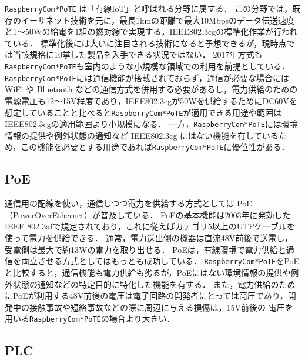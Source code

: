 {\tt Raspberry\-Com*PoTE} は「有線IoT」と呼ばれる分野に属する．
この分野では，既存のイーサネット技術を元に，最長1kmの距離で最大10Mbpsのデータ伝送速度と1〜50Wの給電を1組の撚対線で実現する，IEEE802.3cgの標準化作業が行われている．
標準化後には大いに注目される技術になると予想できるが，現時点では当該規格に10挙した製品を入手できる状況ではない．
2017年方式も{\tt Raspberry\-Com*PoTE}も室内のような小規模な領域での利用を前提としている．
{\tt Raspberry\-Com*PoTE}には通信機能が搭載されておらず，通信が必要な場合には WiFi や Bluetooth などの通信方式を併用する必要があるし，電力供給のための電源電圧も12〜15V程度であり，IEEE802.3cgが50Wを供給するためにDC60Vを想定していることと比べると{\tt Raspberry\-Com*PoTE}が適用できる用途や範囲はIEEE802.3cgの適用範囲より小規模になる．
一方，{\tt Raspberry\-Com*PoTE}には環境情報の提供や例外状態の通知など IEEE802.3cg にはない機能を有しているため，この機能を必要とする用途であれば{\tt Raspberry\-Com*PoTE}に優位性がある．




\subsection{PoE}

通信用の配線を使い，通信しつつ電力を供給する方式としては PoE（PowerOverEthernet）が普及している．
PoEの基本機能は2003年に発効したIEEE 802.3afで規定されており，これに従えばカテゴリ5以上のUTPケーブルを使って電力を供給できる．
通常，電力送出側の機器は直流48V前後で送電し，受電側は最大で約13Wの電力を取り出せる．
PoEは，有線環境で電力供給と通信を両立させる方式としてはもっとも成功している．
{\tt Raspberry\-Com*PoTE}をPoEと比較すると，通信機能も電力供給も劣るが，PoEにはない環境情報の提供や例外状態の通知などの特定目的に特化した機能を有する．
また，電力供給のためにPoEが利用する48V前後の電圧は電子回路の開発者にとっては高圧であり，開発中の接触事故や短絡事故などの際に周辺に与える損傷は，15V前後の
電圧を用いる{\tt Raspberry\-Com*PoTE}の場合より大きい．


\subsection{PLC}

